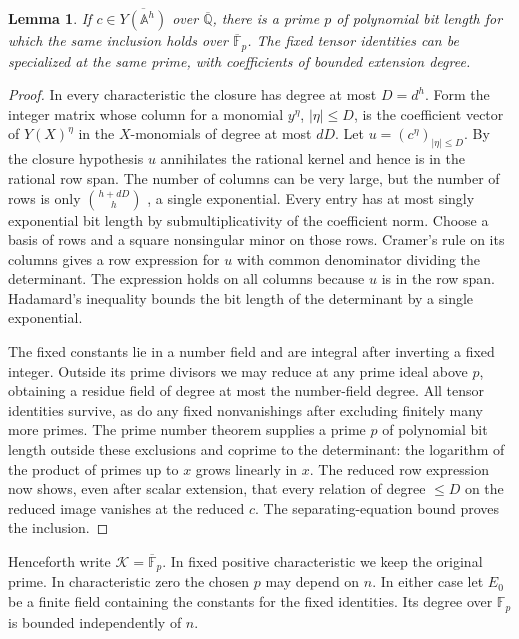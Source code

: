 \documentclass[11pt,letterpaper]{article}
\newtheorem{lemma}[theorem]{Lemma}
\theoremstyle{definition}
\numberwithin{equation}{section}
\begin{document}
\begin{lemma}\label{thm:reduction}
If $c\in\overline{Y(\mathbb{A}^h)}$ over $\overline{\mathbb{Q}}$, there is a prime $p$ of polynomial
bit length for which
the same inclusion holds over $\overline{\mathbb{F}}_p$. The fixed tensor identities can be specialized at the same
prime, with coefficients of bounded extension degree.
\end{lemma}

\begin{proof}
In every characteristic the closure has degree at most $D=d^h$. Form the integer
matrix whose column for a monomial $y^\eta$, $|\eta|\le D$, is the coefficient vector of $Y(X)^\eta$ in
the $X$-monomials of degree at most $dD$. Let $u=(c^\eta)_{|\eta|\le D}$. By the closure hypothesis $u$
annihilates the rational kernel and hence is in the rational row span. The number of columns
can be very large, but the number of rows is only $\binom{h+dD}{h}$
, a single exponential. Every entry
has at most singly exponential bit length by submultiplicativity of the coefficient norm.
Choose a basis of rows and a square nonsingular minor on those rows. Cramer's rule on its
columns gives a row expression for $u$ with common denominator dividing the determinant.
The expression holds on all columns because $u$ is in the row span. Hadamard's inequality
bounds the bit length of the determinant by a single exponential.

The fixed constants lie in a number field and are integral after inverting a fixed integer.
Outside its prime divisors we may reduce at any prime ideal above $p$, obtaining a residue
field of degree at most the number-field degree. All tensor identities survive, as do any
fixed nonvanishings after excluding finitely many more primes. The prime number theorem
supplies a prime $p$ of polynomial bit length outside these exclusions and coprime to the
determinant: the logarithm of the product of primes up to $x$ grows linearly in $x$. The
reduced row expression now shows, even after scalar extension, that every relation of degree
$\le D$ on the reduced image vanishes at the reduced $c$. The separating-equation bound proves
the inclusion.
\end{proof}

Henceforth write $\mathcal{K}=\overline{\mathbb{F}}_p$. In fixed positive characteristic we keep the
original prime. In
characteristic zero the chosen $p$ may depend on $n$. In either case let $E_0$ be a finite field
containing the constants for the fixed identities. Its degree over $\mathbb{F}_p$ is bounded independently
of $n$.
\end{document}
